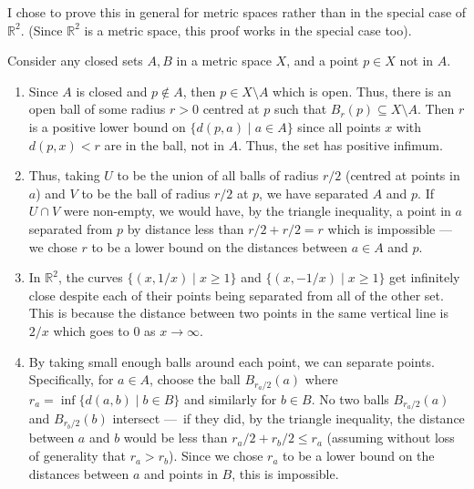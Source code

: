 \documentclass[12 pt, letterpaper]{hmcpset}
\begin{document}
\begin{solution}
	I chose to prove this in general for metric spaces rather than in the special case of $\mathbb{R}^{2}$. (Since $\mathbb{R}^{2}$ is a metric space, this proof works in the special case too). 

	Consider any closed sets $A, B$ in a metric space $X$, and a point $p \in X$ not in $A$.
	\begin{enumerate}
		\item Since $A$ is closed and $p \not\in A$, then $p \in X \setminus A$ which is open. Thus, there is an open ball of some radius $r > 0$ centred at $p$ such that $B_{r}(p) \subseteq {X \setminus A}$. Then $r$ is a positive lower bound on $\{ d(p, a) \mid a \in A \}$ since all points $x$ with $d(p, x) < r$ are in the ball, not in $A$. Thus, the set has positive infimum.

		\item Thus, taking $U$ to be the union of all balls of radius $r / 2$ (centred at points in $a$) and $V$ to be the ball of radius $r / 2$ at $p$, we have separated $A$ and $p$. If $U \cap V$ were non-empty, we would have, by the triangle inequality, a point in $a$ separated from $p$ by distance less than $r / 2 + r / 2 = r$ which is impossible --- we chose $r$ to be a lower bound on the distances between $a \in A$ and $p$.

		\item In $\mathbb{R}^{2}$, the curves $\{ (x, 1 / x) \mid x \ge 1 \}$ and $\{ (x, -1 / x) \mid x \ge 1 \}$ get infinitely close despite each of their points being separated from all of the other set. This is because the distance between two points in the same vertical line is $2 / x$ which goes to $0$ as $x \to \infty$.

		\item By taking small enough balls around each point, we can separate points. Specifically, for $a \in A$, choose the ball $B_{r_{a} / 2}(a)$ where $r_{a} = \inf \{ d(a, b) \mid b \in B \}$ and similarly for $b \in B$. No two balls $B_{r_{a} / 2}(a)$ and $B_{r_{b} / 2}(b)$ intersect — if they did, by the triangle inequality, the distance between $a$ and $b$ would be less than $r_{a} / 2 + r_{b} / 2 \leq r_{a}$ (assuming without loss of generality that $r_{a} > r_{b}$). Since we chose $r_{a}$ to be a lower bound on the distances between $a$ and points in $B$, this is impossible.
	\end{enumerate}
\end{solution}

\pagebreak
\end{document}
